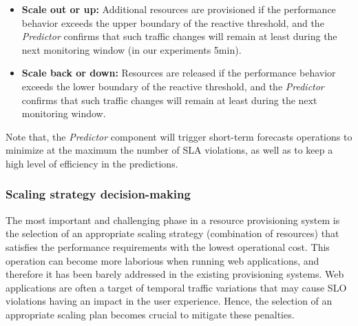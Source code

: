 \begin{itemize}

\item \textbf{Scale out or up:} Additional resources are provisioned if the performance behavior exceeds the upper boundary of the reactive threshold, and the \emph{Predictor} confirms that such traffic changes will remain at least during the next monitoring window (in our experiments 5min). 

\item \textbf{Scale back or down:} Resources are released if the performance behavior exceeds the lower boundary of the reactive threshold, and the \emph{Predictor} confirms that such traffic changes will remain at least during the next monitoring window.

\end{itemize}

Note that, the \emph{Predictor} component will trigger short-term forecasts operations to minimize at the maximum the number of SLA violations, as well as to keep a high level of efficiency in the predictions. 




\subsubsection{Scaling strategy decision-making}
The most important and challenging phase in a resource provisioning system is the selection of an appropriate scaling strategy (combination of resources) that satisfies the performance requirements with the lowest operational cost. This operation can become more laborious when running web applications, and therefore it has been barely addressed in the existing provisioning systems. Web applications are often a target of temporal traffic variations that may cause SLO violations having an impact in the user experience. Hence, the selection of an appropriate scaling plan becomes crucial to mitigate these penalties. 


